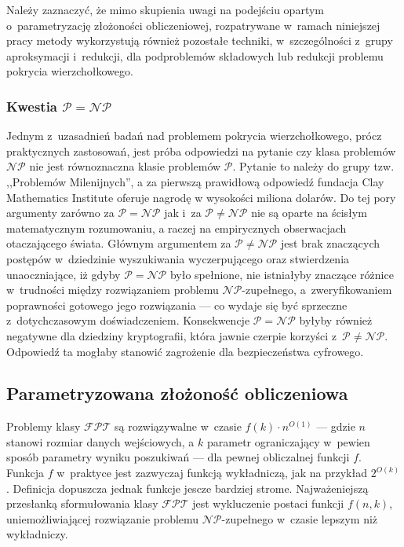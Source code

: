 {Należy zaznaczyć, że mimo skupienia uwagi na podejściu opartym o~parametryzację złożoności obliczeniowej, rozpatrywane w~ramach niniejszej pracy metody wykorzystują również pozostałe techniki, w~szczególności z~grupy aproksymacji i~redukcji, dla podproblemów składowych lub redukcji problemu pokrycia wierzchołkowego.
}
\subsubsection{\textbf{Kwestia $\mathcal{P}=\mathcal{NP}$}}
\label{sss_problem_p_neq_np}
\par{
  Jednym z~uzasadnień badań nad problemem pokrycia wierzchołkowego, prócz
  praktycznych zastosowań, jest próba odpowiedzi na pytanie czy klasa problemów
  $\mathcal{NP}$ nie jest równoznaczna klasie problemów $\mathcal{P}$.
  Pytanie to należy do grupy tzw. ,,Problemów Milenijnych'', a za pierwszą
  prawidłową odpowiedź fundacja Clay Mathematics Institute oferuje nagrodę w
  wysokości miliona dolarów. 
  Do tej pory argumenty zarówno za $\mathcal{P}=\mathcal{NP}$ jak i~za
  $\mathcal{P}\neq\mathcal{NP}$ nie są oparte na ścisłym matematycznym
  rozumowaniu, a raczej na empirycznych obserwacjach otaczającego świata.
  Głównym argumentem za $\mathcal{P}\neq\mathcal{NP}$ jest brak znaczących
  postępów w~dziedzinie wyszukiwania wyczerpującego oraz stwierdzenia
  unaoczniające, iż gdyby $\mathcal{P}=\mathcal{NP}$ było spełnione, nie 
  istniałyby znaczące różnice w~trudności między rozwiązaniem 
  problemu $\mathcal{NP}$-zupełnego, a~zweryfikowaniem poprawności gotowego 
  jego rozwiązania --- co wydaje się być sprzeczne z~dotychczasowym doświadczeniem.
  Konsekwencje $\mathcal{P}=\mathcal{NP}$ byłyby również negatywne dla dziedziny
  kryptografii, która jawnie czerpie korzyści z~$\mathcal{P}\neq\mathcal{NP}$.
  Odpowiedź ta mogłaby stanowić zagrożenie dla bezpieczeństwa cyfrowego.
}

\subsection{Parametryzowana złożoność obliczeniowa}
\label{sss_parametric_complexity}
\par{
  Problemy klasy $\mathcal{FPT}$ są rozwiązywalne w~czasie $f(k)\cdot n^{O(1)}$ --- gdzie $n$ stanowi rozmiar danych wejściowych, a $k$ parametr ograniczający w~pewien sposób parametry wyniku poszukiwań --- dla pewnej obliczalnej funkcji $f$.
  Funkcja $f$ w~praktyce jest zazwyczaj funkcją wykładniczą, jak na przykład $2^{O(k)}$.
  Definicja dopuszcza jednak funkcje jescze bardziej strome.
  Najważeniejszą przesłanką sformułowania klasy $\mathcal{FPT}$ jest wykluczenie postaci funkcji $f(n,k)$, uniemożliwiającej rozwiązanie problemu $\mathcal{NP}$-zupełnego w~czasie lepszym niż wykładniczy.
}

